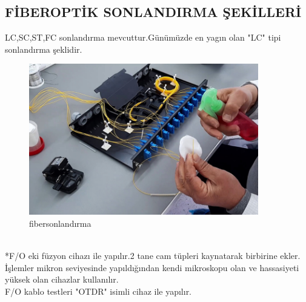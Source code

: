 \subsection*{FİBEROPTİK SONLANDIRMA ŞEKİLLERİ}
LC,SC,ST,FC sonlandırma mevcuttur.Günümüzde en yagın olan "LC" tipi sonlandırma şeklidir.\\
\begin{figure}[ht]
    \centering
    \includegraphics[width=10cm]{images/Fiber-Optik-Ek-ve-Sonlandirma}
    \caption{fibersonlandırma}
    \label{fig:fosonlandirma}
\end{figure}
\\
*F/O eki füzyon cihazı ile yapılır.2 tane cam tüpleri kaynatarak birbirine ekler.\\
İşlemler mikron seviyesinde yapıldığından kendi mikroskopu olan ve hassasiyeti yüksek olan cihazlar kullanılır. \\
F/O kablo testleri "OTDR" isimli cihaz  ile yapılır.

